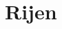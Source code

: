 \documentclass[main.tex]{subfiles}
\begin{document}
\chapter{Rijen}
\label{cha:rijen}



\end{document}
